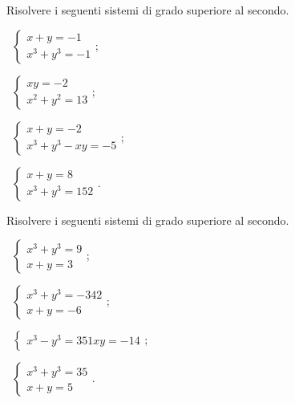 \begin{esercizio}[\Ast]
 \label{ese:6.26}
Risolvere i seguenti sistemi di grado superiore al secondo.
\begin{multicols}{2}
 \begin{enumeratea}
 \item~$\left\{\begin{array}{l}{x+y=-1}\\{x^3+y^3=-1}\end{array}\right.$;
 \item~$\left\{\begin{array}{l}{{xy}=-2}\\{x^2+y^2=13}\end{array}\right.$;
 \item~$\left\{\begin{array}{l}{x+y=-2}\\{x^3+y^3-{xy}=-5}\end{array}\right.$;
 \item~$\left\{\begin{array}{l}{x+y=8}\\{x^3+y^3=152}\end{array}\right.$.
 \end{enumeratea}
 \end{multicols}
\end{esercizio}

\begin{esercizio}[\Ast]
 \label{ese:6.27}
Risolvere i seguenti sistemi di grado superiore al secondo.
\begin{multicols}{2}
 \begin{enumeratea}
 \item~$\left\{\begin{array}{l}x^3+y^3=9\\x+y=3\end{array}\right.$;
 \item~$\left\{\begin{array}{l}x^3+y^3=-342\\x+y=-6\end{array}\right.$;
 \item~$\left\{\begin{array}{l}{x^3-y^3=351}{{xy}=-14}\end{array}\right.$;
 \item~$\left\{\begin{array}{l}x^3+y^3=35\\x+y=5\end{array}\right.$.
 \end{enumeratea}
 \end{multicols}
\end{esercizio}

